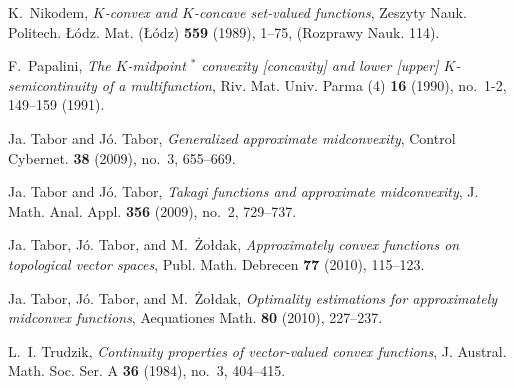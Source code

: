 \documentclass[12pt,reqno]{amsart}
\theoremstyle{definition}
\begin{document}
\begin{thebibliography}{10}
K.~Nikodem, \emph{{$K$}-convex and {$K$}-concave set-valued functions}, Zeszyty
  Nauk. Politech. Łódz. Mat. (Łódz) \textbf{559} (1989), 1–75, (Rozprawy
  Nauk. 114).

F.~Papalini, \emph{The {$K$}-midpoint {$^*$} convexity [concavity] and lower
  [upper] {$K$}-semicontinuity of a multifunction}, Riv. Mat. Univ. Parma (4)
  \textbf{16} (1990), no.~1-2, 149–159 (1991). 

Ja. Tabor and Jó. Tabor, \emph{Generalized approximate midconvexity}, Control
  Cybernet. \textbf{38} (2009), no.~3, 655–669. 

Ja. Tabor and Jó. Tabor, \emph{Takagi functions and approximate midconvexity}, J. Math. Anal.
  Appl. \textbf{356} (2009), no.~2, 729–737.

Ja. Tabor, Jó. Tabor, and M.~Żołdak, \emph{Approximately convex functions on
  topological vector spaces}, Publ. Math. Debrecen \textbf{77} (2010),
  115–123. 

Ja. Tabor, Jó. Tabor, and M.~Żołdak, \emph{Optimality estimations for approximately midconvex functions},
  Aequationes Math. \textbf{80} (2010), 227–237. 

L.~I. Trudzik, \emph{Continuity properties of vector-valued convex functions},
  J. Austral. Math. Soc. Ser. A \textbf{36} (1984), no.~3, 404–415.

\end{thebibliography}
\end{document}
